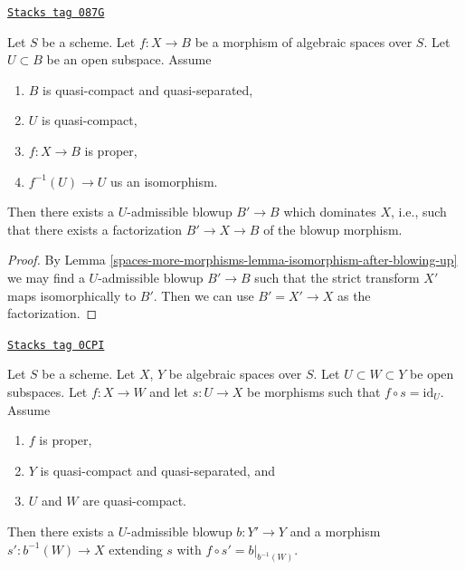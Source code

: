 \begin{lemma}
\label{spaces-more-morphisms-lemma-dominate-modification-by-blowup}
\href{https://stacks.math.columbia.edu/tag/087G}{\texttt{Stacks tag 087G}}

Let $S$ be a scheme. Let $f : X \to B$ be a morphism of algebraic spaces
over $S$. Let $U \subset B$ be an open subspace. Assume
\begin{enumerate}
\item $B$ is quasi-compact and quasi-separated,
\item $U$ is quasi-compact,
\item $f : X \to B$ is proper,
\item $f^{-1}(U) \to U$ us an isomorphism.
\end{enumerate}
Then there exists a $U$-admissible blowup $B' \to B$ which dominates $X$,
i.e., such that there exists a factorization $B' \to X \to B$
of the blowup morphism.
\end{lemma}

\begin{proof}
By Lemma \ref{spaces-more-morphisms-lemma-isomorphism-after-blowing-up} we may find a $U$-admissible
blowup $B' \to B$ such that the strict transform $X'$ maps isomorphically to
$B'$. Then we can use $B' = X' \to X$ as the factorization.
\end{proof}

\begin{lemma}
\label{spaces-more-morphisms-lemma-get-section-after-blowup}
\href{https://stacks.math.columbia.edu/tag/0CPI}{\texttt{Stacks tag 0CPI}}

Let $S$ be a scheme. Let $X$, $Y$ be algebraic spaces over $S$.
Let $U \subset W \subset Y$ be open subspaces.
Let $f : X \to W$ and let $s : U \to X$ be morphisms
such that $f \circ s = \text{id}_U$. Assume
\begin{enumerate}
\item $f$ is proper,
\item $Y$ is quasi-compact and quasi-separated, and
\item $U$ and $W$ are quasi-compact.
\end{enumerate}
Then there exists a $U$-admissible blowup $b : Y' \to Y$ and a morphism
$s' : b^{-1}(W) \to X$ extending $s$ with $f \circ s' = b|_{b^{-1}(W)}$.
\end{lemma}


